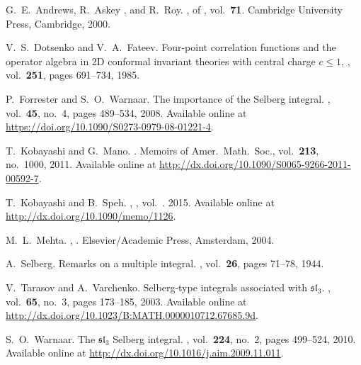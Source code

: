 \begin{thebibliography}{1}
  G.~E.~Andrews, R.~Askey , and 
  R.~Roy.{\newblock} ,  of , vol.~\textbf{71}.{\newblock} Cambridge
  University Press, Cambridge, 2000.{\newblock}
  
  V.~S.~Dotsenko  and  V.~A.~Fateev.{\newblock}
  Four-point correlation functions and the operator algebra in 2D conformal
  invariant theories with central charge $c \leq 1$, , vol.~\textbf{251}, pages 691--734, 1985.{\newblock}
  
  P.~Forrester  and 
  S.~O.~Warnaar.{\newblock} The importance of the Selberg integral.{\newblock}
  , vol.~\textbf{45}, no.~4, pages 489--534,
  2008.{\newblock} Available online at
  \url{https://doi.org/10.1090/S0273-0979-08-01221-4}.{\newblock}
  
  T.~Kobayashi  and  G.~Mano.{\newblock}
  .{\newblock} Memoirs of Amer.~Math.~Soc., vol.~\textbf{213}, no.~1000, 2011.{\newblock} Available online at
  \url{http://dx.doi.org/10.1090/S0065-9266-2011-00592-7}.{\newblock}
  
  T.~Kobayashi  and  B.~Speh.{\newblock}
  , {\newblock} , vol.~\textbf{}. 2015.{\newblock} Available online at
  \url{http://dx.doi.org/10.1090/memo/1126}.{\newblock}
  
  M.~L.~Mehta.{\newblock} , .{\newblock} Elsevier/Academic Press, Amsterdam, 2004.{\newblock}
  
  
  A.~Selberg.{\newblock} Remarks on a multiple
  integral.{\newblock} , vol.~\textbf{26}, pages 71--78,
  1944.{\newblock}
  
  V.~Tarasov  and  A.~Varchenko.{\newblock}
  Selberg-type integrals associated with $\mathfrak{s}\mathfrak{l}_3$.{\newblock}
  , vol.~\textbf{65}, no.~3, pages 173--185,
  2003.{\newblock} Available online at
  \url{http://dx.doi.org/10.1023/B:MATH.0000010712.67685.9d}.{\newblock}
  
  S.~O.~Warnaar.{\newblock} The $\mathfrak{sl}_3$
  Selberg integral.{\newblock} , vol.~\textbf{224}, no.~2, pages
  499--524, 2010.{\newblock} Available online at
  \url{http://dx.doi.org/10.1016/j.aim.2009.11.011}.{\newblock}
\end{thebibliography}
